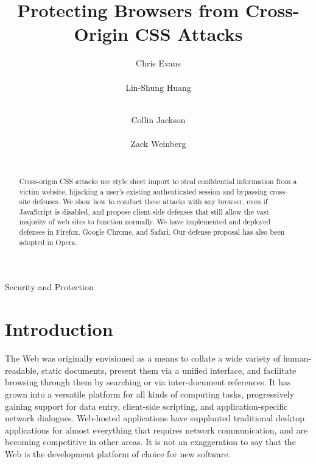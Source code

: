 \documentclass{acm_proc_article-sp}
\begin{document}
\title{Protecting Browsers from Cross-Origin CSS Attacks}
\author{
\alignauthor
Chris Evans\\
      \\
\alignauthor
Lin-Shung Huang\\
      \\
\and
\alignauthor
Collin Jackson\\
      \\
\alignauthor
Zack Weinberg\\
      \\
}

\newcommand{\todo}[1]{\textbf{[TODO: #1]}}

\maketitle
\begin{abstract}
Cross-origin CSS attacks use style sheet import to steal confidential
information from a victim website, hijacking a user's existing
authenticated session and bypassing cross-site defenses.  We show how
to conduct these attacks with any browser, even if JavaScript is
disabled, and propose client-side defenses that still allow the vast
majority of web sites to function normally. We have implemented and
deployed defenses in Firefox, Google Chrome, and Safari. Our defense
proposal has also been adopted in Opera.
\end{abstract}

                {Security and Protection}



\section{Introduction}

The Web was originally envisioned \cite{wwwproposal} as a means to
collate a wide variety of human-readable, static documents, present
them via a unified interface, and facilitate browsing through them by
searching or via inter-document references. It has grown into a
versatile platform for all kinds of computing tasks, progressively
gaining support for data entry, client-side scripting, and
application-specific network dialogues.  Web-hosted applications have
supplanted traditional desktop applications for almost everything that
requires network communication, and are becoming competitive in other
areas.  It is not an exaggeration to say that the Web is the
development platform of choice for new software.
\end{document}
